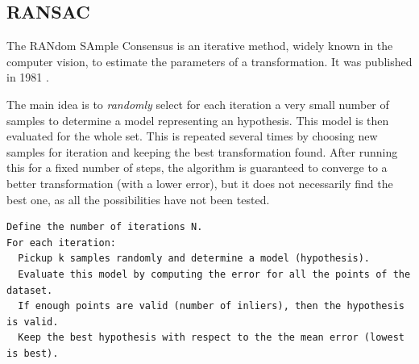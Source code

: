 \subsection{RANSAC}
\label{sub:ransac}

The RANdom SAmple Consensus is an iterative method, widely known in the computer vision, to estimate the parameters of a transformation. It was published in 1981 \cite{FischlerB81}.

The main idea is to \emph{randomly} select for each iteration a very small number of samples to determine a model representing an hypothesis. This model is then evaluated for the whole set. This is repeated several times by choosing new samples for iteration and keeping the best transformation found. After running this for a fixed number of steps, the algorithm is guaranteed to converge to a better transformation (with a lower error), but it does not necessarily find the best one, as all the possibilities have not been tested. 

\begin{verbatim}
Define the number of iterations N.
For each iteration:
  Pickup k samples randomly and determine a model (hypothesis).
  Evaluate this model by computing the error for all the points of the dataset.
  If enough points are valid (number of inliers), then the hypothesis is valid.
  Keep the best hypothesis with respect to the the mean error (lowest is best).
\end{verbatim}

